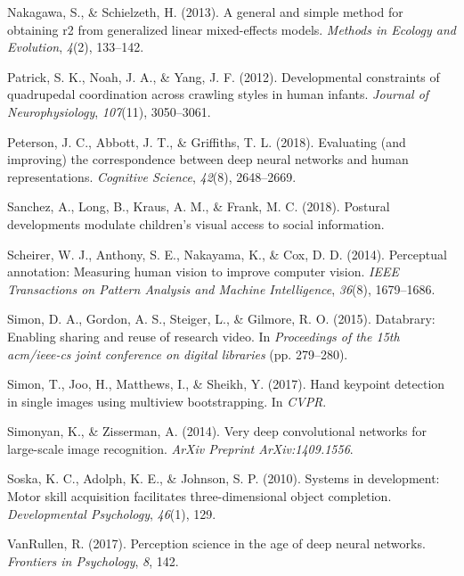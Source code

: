 \documentclass[english,man]{apa6}
\begin{document}
\hypertarget{ref-nakagawa2013general}{}
Nakagawa, S., \& Schielzeth, H. (2013). A general and simple method for
obtaining r2 from generalized linear mixed-effects models. \emph{Methods
in Ecology and Evolution}, \emph{4}(2), 133--142.

\hypertarget{ref-patrick2012developmental}{}
Patrick, S. K., Noah, J. A., \& Yang, J. F. (2012). Developmental
constraints of quadrupedal coordination across crawling styles in human
infants. \emph{Journal of Neurophysiology}, \emph{107}(11), 3050--3061.

\hypertarget{ref-peterson2018evaluating}{}
Peterson, J. C., Abbott, J. T., \& Griffiths, T. L. (2018). Evaluating
(and improving) the correspondence between deep neural networks and
human representations. \emph{Cognitive Science}, \emph{42}(8),
2648--2669.

\hypertarget{ref-sanchez2018postural}{}
Sanchez, A., Long, B., Kraus, A. M., \& Frank, M. C. (2018). Postural
developments modulate children's visual access to social information.

\hypertarget{ref-scheirer2014perceptual}{}
Scheirer, W. J., Anthony, S. E., Nakayama, K., \& Cox, D. D. (2014).
Perceptual annotation: Measuring human vision to improve computer
vision. \emph{IEEE Transactions on Pattern Analysis and Machine
Intelligence}, \emph{36}(8), 1679--1686.

\hypertarget{ref-simon2015databrary}{}
Simon, D. A., Gordon, A. S., Steiger, L., \& Gilmore, R. O. (2015).
Databrary: Enabling sharing and reuse of research video. In
\emph{Proceedings of the 15th acm/ieee-cs joint conference on digital
libraries} (pp. 279--280).

\hypertarget{ref-simon2017hand}{}
Simon, T., Joo, H., Matthews, I., \& Sheikh, Y. (2017). Hand keypoint
detection in single images using multiview bootstrapping. In
\emph{CVPR}.

\hypertarget{ref-simonyan2014very}{}
Simonyan, K., \& Zisserman, A. (2014). Very deep convolutional networks
for large-scale image recognition. \emph{ArXiv Preprint
ArXiv:1409.1556}.

\hypertarget{ref-soska2010systems}{}
Soska, K. C., Adolph, K. E., \& Johnson, S. P. (2010). Systems in
development: Motor skill acquisition facilitates three-dimensional
object completion. \emph{Developmental Psychology}, \emph{46}(1), 129.

\hypertarget{ref-vanrullen2017perception}{}
VanRullen, R. (2017). Perception science in the age of deep neural
networks. \emph{Frontiers in Psychology}, \emph{8}, 142.
\end{document}
